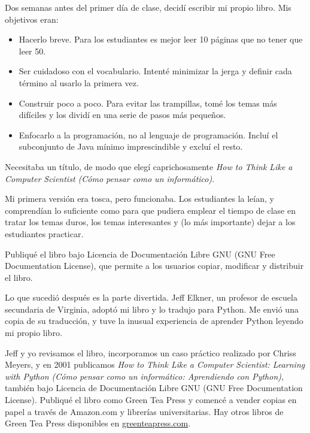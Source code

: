 Dos semanas antes del primer día de clase, decidí escribir mi
propio libro.
Mis objetivos eran:

\begin{itemize}

\item Hacerlo breve. Para los estudiantes es mejor leer 10 páginas
que no tener que leer 50.

\item Ser cuidadoso con el vocabulario. Intenté minimizar la jerga
y definir cada término al usarlo la primera vez.

\item Construir poco a poco. Para evitar las trampillas, tomé los temas
más difíciles y los dividí en una serie de pasos más pequeños.

\item Enfocarlo a la programación, no al lenguaje de programación. Incluí
el subconjunto de Java mínimo imprescindible y excluí el resto.

\end{itemize}

Necesitaba un título, de modo que elegí caprichosamente \emph{How to Think Like
a Computer Scientist (Cómo pensar como un informático)}.

Mi primera versión era tosca, pero funcionaba. Los estudiantes la leían,
y comprendían lo suficiente como para que pudiera emplear el tiempo de clase
en tratar los temas duros, los temas interesantes y (lo más importante) dejar a los
estudiantes practicar.

Publiqué el libro bajo Licencia de Documentación Libre GNU (GNU Free Documentation License),
que permite a los usuarios copiar, modificar y distribuir el libro.


Lo que sucedió después es la parte divertida. Jeff Elkner, un profesor
de escuela secundaria de Virginia, adoptó mi libro y lo tradujo para
Python. Me envió una copia de su traducción, y tuve la inusual
experiencia de aprender Python leyendo mi propio libro.

Jeff y yo revisamos el libro, incorporamos un caso práctico realizado por
Chriss Meyers, y en 2001 publicamos \emph{How to Think Like
a Computer Scientist: Learning with Python (Cómo pensar como un informático:
Aprendiendo con Python)}, también bajo
Licencia de Documentación Libre GNU (GNU Free Documentation License).
Publiqué el libro como Green Tea Press y comencé a vender
copias en papel a través de Amazon.com y librerías universitarias.
Hay otros libros de Green Tea Press disponibles en
\url{greenteapress.com}.

